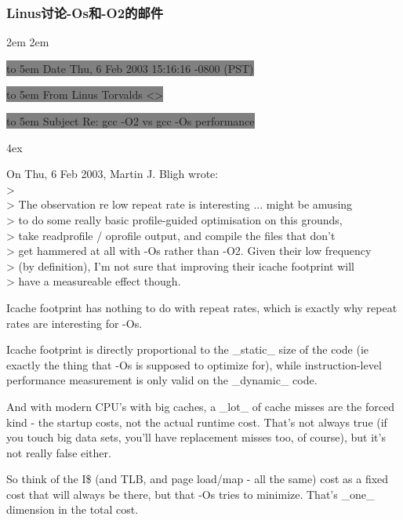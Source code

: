\begin{insertnote}

\subsubsection*{Linus讨论-Os和-O2的邮件}

\leftskip 2em
\rightskip 2em
\parindent 0pt

\colorbox{gray}{\hbox to 5em {Date} Thu, 6 Feb 2003 15:16:16 -0800 (PST)}

\colorbox{gray}{\hbox to 5em {From}	 Linus Torvalds <>   }

\colorbox{gray}{\hbox to 5em {Subject}	Re: gcc -O2 vs gcc -Os performance }

\footnotesize 

\parskip 4ex

\noindent{}On Thu, 6 Feb 2003, Martin J. Bligh wrote:\\
> \\
> The observation re low repeat rate is interesting ... might be amusing \\
> to do some really basic profile-guided optimisation on this grounds,\\
> take readprofile / oprofile output, and compile the files that don't\\
> get hammered at all with -Os rather than -O2. Given their low frequency\\
> (by definition), I'm not sure that improving their icache footprint will\\
> have a measureable effect though.

Icache footprint has nothing to do with repeat rates, which is exactly why 
repeat rates are interesting for -Os.

Icache footprint is directly proportional to the \_static\_ size of the code 
(ie exactly the thing that -Os is supposed to optimize for), while 
instruction-level performance measurement is only valid on the \_dynamic\_ 
code.

And with modern CPU's with big caches, a \_lot\_ of cache misses are the 
forced kind - the startup costs, not the actual runtime cost. That's not 
always true (if you touch big data sets, you'll have replacement misses 
too, of course), but it's not really false either.

So think of the I\$ (and TLB, and page load/map - all the same) cost as a 
fixed cost that will always be there, but that -Os tries to minimize. 
That's \_one\_ dimension in the total cost.


\end{insertnote}
